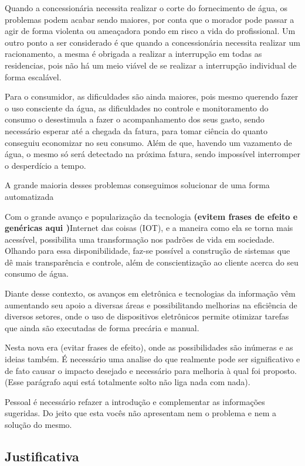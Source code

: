 \documentclass[
	article,			%
	11pt,				%
	oneside,			%
	a4paper,			%
	english,			%
	brazil,				%
	sumario=tradicional
	]{abntex2}
\begin{document}
    Quando a concessionária necessita realizar o corte do fornecimento de água, os problemas podem acabar sendo maiores, por conta que o morador pode passar a agir de forma violenta ou ameaçadora pondo em risco a vida do profissional. Um outro ponto a ser considerado é que quando a concessionária necessita realizar um racionamento, a mesma é obrigada a realizar a interrupção em todas as residencias, pois não há um meio viável de se realizar a interrupção individual de forma escalável.
    
    Para o consumidor, as dificuldades são ainda maiores, pois mesmo querendo fazer o uso consciente da água, as dificuldades no controle e monitoramento do consumo o desestimula a fazer o acompanhamento dos seus gasto, sendo necessário esperar até a chegada da fatura, para tomar ciência do quanto conseguiu economizar no seu consumo. Além de que, havendo um vazamento de água, o mesmo só será detectado na próxima fatura, sendo impossível interromper o desperdício a tempo.
    
    A grande maioria desses problemas conseguimos solucionar de uma forma automatizada 
    
    Com o grande avanço e popularização da tecnologia \textbf{(evitem frases de efeito e genéricas aqui )}Internet das coisas (IOT), e a maneira como ela se torna mais acessível, possibilita uma transformação nos padrões de vida em sociedade. Olhando para essa disponibilidade, faz-se possível a construção de sistemas que dê mais transparência e controle, além de conscientização ao cliente acerca do seu consumo de água.
    
    Diante desse contexto, os avanços em eletrônica e tecnologias da informação vêm aumentando seu apoio a diversas áreas e possibilitando melhorias na eficiência de diversos setores, onde o uso de dispositivos eletrônicos permite otimizar tarefas que ainda são executadas de forma precária e manual.
    
    Nesta nova era (evitar frases de efeito), onde as possibilidades são inúmeras e as ideias também. É necessário uma analise do que realmente pode ser significativo e de fato causar o impacto desejado e necessário para melhoria à qual foi proposto. (Esse parágrafo aqui está totalmente solto não liga nada com nada).
    
    Pessoal é necessário refazer a introdução e complementar as informações sugeridas. Do jeito que esta vocês não apresentam nem o problema e nem a solução do mesmo.
\newpage
\subsection{Justificativa}
\end{document}
